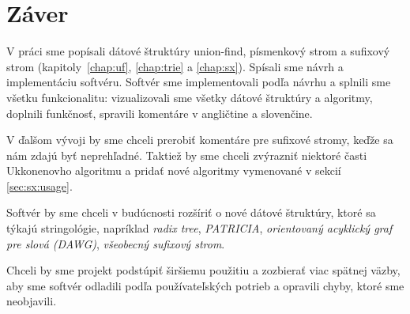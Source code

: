 \cleardoublepage
{}
{}
\chapter*{Záver}\label{chap:zaver}

V práci sme popísali dátové štruktúry union-find, písmenkový strom a sufixový 
strom (kapitoly~\ref{chap:uf}, \ref{chap:trie} a \ref{chap:sx}). Spísali sme 
návrh a implementáciu softvéru. Softvér sme implementovali 
podľa návrhu a splnili sme všetku funkcionalitu: vizualizovali sme všetky 
dátové štruktúry a algoritmy, doplnili funkčnosť, spravili komentáre v 
angličtine a slovenčine.

V ďalšom vývoji by sme chceli prerobiť komentáre pre sufixové stromy, keďže sa 
nám zdajú byť neprehľadné. Taktiež by sme chceli zvýrazniť niektoré časti 
Ukkonenovho algoritmu a pridať nové algoritmy vymenované v sekcií 
\ref{sec:sx:usage}.

Softvér by sme chceli v budúcnosti rozšíriť o nové dátové štruktúry, ktoré sa 
týkajú stringológie, napríklad \emph{radix tree}, \emph{PATRICIA}, 
\emph{orientovaný acyklický graf pre slová (DAWG)}, \emph{všeobecný sufixový 
strom}.

Chceli by sme projekt podstúpiť širšiemu použitiu a zozbierať viac spätnej 
väzby, aby sme softvér odladili podľa používateľských potrieb a opravili 
chyby, ktoré sme neobjavili. 


\cleardoublepage
{}
{}

\printbibliography

\backmatter

\newpage
\pagestyle{empty}
\hbox{}